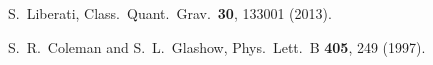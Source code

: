 \documentclass[12pt]{article}
\begin{document}
\begin{thebibliography}{99}


  S.~Liberati,
  Class.\ Quant.\ Grav.\  {\bf 30}, 133001 (2013).







  S.~R.~Coleman and S.~L.~Glashow,
  Phys.\ Lett.\ B {\bf 405}, 249 (1997).



\end{thebibliography}
\end{document}
